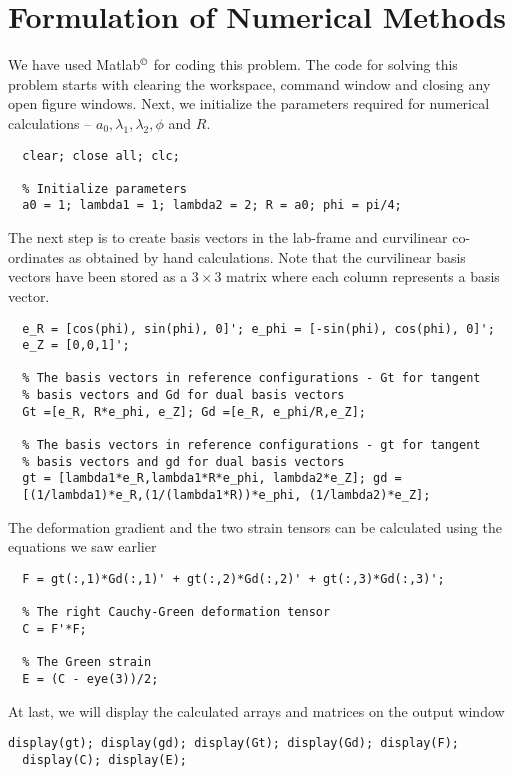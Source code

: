 \documentclass[../main.tex]{subfiles}
\begin{document}
\section{Formulation of Numerical Methods}
We have used Matlab$^\copyright$ for coding this problem. The code for
solving this problem starts with clearing the workspace, command
window and closing any open figure windows. Next, we initialize the
parameters required for numerical calculations --
$a_0,\lambda_1,\lambda_2,\phi$ and $R$.
\begin{lstlisting}[style=Matlab-editor]
  % Clean the set-up
  clear; close all; clc;
  
  % Initialize parameters
  a0 = 1; lambda1 = 1; lambda2 = 2; R = a0; phi = pi/4;
\end{lstlisting}
The next step is to create basis vectors in the lab-frame and
curvilinear co-ordinates as obtained by hand calculations. Note that
the curvilinear basis vectors have been stored as a $3\times3$ matrix
where each column represents a basis vector.
\begin{lstlisting}[style=Matlab-editor]
  % The cylindrical basis vectors
  e_R = [cos(phi), sin(phi), 0]'; e_phi = [-sin(phi), cos(phi), 0]';
  e_Z = [0,0,1]';
  
  % The basis vectors in reference configurations - Gt for tangent
  % basis vectors and Gd for dual basis vectors
  Gt =[e_R, R*e_phi, e_Z]; Gd =[e_R, e_phi/R,e_Z];
  
  % The basis vectors in reference configurations - gt for tangent
  % basis vectors and gd for dual basis vectors
  gt = [lambda1*e_R,lambda1*R*e_phi, lambda2*e_Z]; gd =
  [(1/lambda1)*e_R,(1/(lambda1*R))*e_phi, (1/lambda2)*e_Z];
\end{lstlisting}

The deformation gradient and the two strain tensors can be calculated
using the equations we saw earlier
\begin{lstlisting}[style=Matlab-editor]
  % Deformation Gradient, $ F = gt(:,i) \otimes Gd(:,i) $
  F = gt(:,1)*Gd(:,1)' + gt(:,2)*Gd(:,2)' + gt(:,3)*Gd(:,3)';
  
  % The right Cauchy-Green deformation tensor
  C = F'*F;
  
  % The Green strain
  E = (C - eye(3))/2;
\end{lstlisting}
At last, we will display the calculated arrays and matrices on the
output window
\begin{lstlisting}[style=Matlab-editor]
  display(gt); display(gd); display(Gt); display(Gd); display(F);
  display(C); display(E);
\end{lstlisting}
\end{document}
